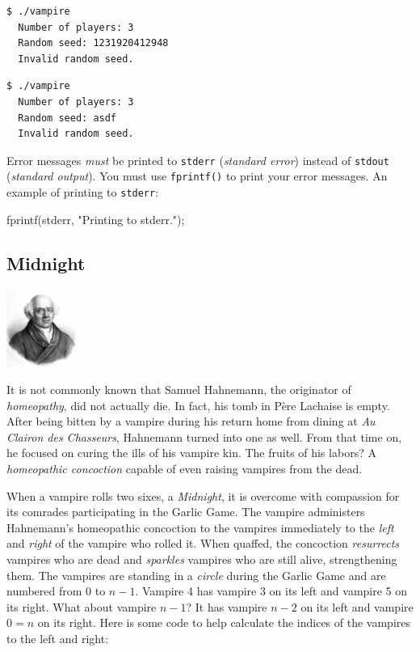 \documentclass[11pt]{article}
\begin{document}
\begin{lstlisting}[style=bashstyle]
  $ ./vampire
  Number of players: 3
  Random seed: 1231920412948
  Invalid random seed.
\end{lstlisting}

\begin{lstlisting}[style=bashstyle]
  $ ./vampire
  Number of players: 3
  Random seed: asdf
  Invalid random seed.
\end{lstlisting}

Error messages \emph{must} be printed to \texttt{stderr} (\emph{standard error})
instead of \texttt{stdout} (\emph{standard output}). You must use
\texttt{fprintf()} to print your error messages. An example of printing to
\texttt{stderr}:

\begin{codelisting}{}
fprintf(stderr, "Printing to stderr.\n");
\end{codelisting}


\subsection{Midnight}

\begin{floatingfigure}[v]{1in}
\includegraphics[height=1in]{images/samuel-hahnemann-german-physician-science-source.jpg}
\end{floatingfigure}

It is not commonly known that Samuel Hahnemann, the originator of
\emph{homeopathy}, did not actually die. In fact, his tomb in P\`ere Lachaise is
empty. After being bitten by a vampire during his return home from dining at \emph{Au
Clairon des Chasseurs}, Hahnemann turned into one as well. From that time on, he
focused on curing the ills of his vampire kin. The fruits of his labors? A
\emph{homeopathic concoction} capable of even raising vampires from the dead.

When a vampire rolls two sixes, a \emph{Midnight}, it is overcome with
compassion for its comrades participating in the Garlic Game. The vampire
administers Hahnemann's homeopathic concoction to the vampires immediately to
the \emph{left} and \emph{right} of the vampire who rolled it. When quaffed, the
concoction \emph{resurrects} vampires who are dead and \emph{sparkles} vampires
who are still alive, strengthening them. The vampires are standing in a
\emph{circle} during the Garlic Game and are numbered from 0 to $n-1$. Vampire 4
has vampire 3 on its left and vampire 5 on its right. What about vampire $n-1$?
It has vampire $n-2$ on its left and vampire $0=n$ on its right. Here is some
code to help calculate the indices of the vampires to the left and right:
\end{document}
